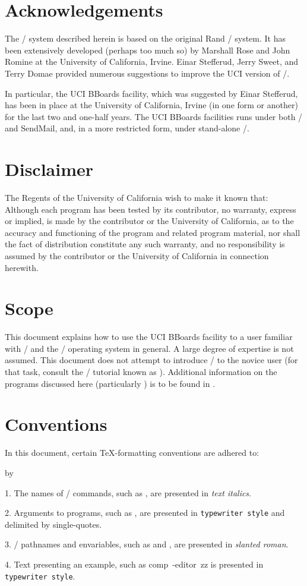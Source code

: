 \banner
\section{Acknowledgements}
The \MH/ system described herein is based on the original Rand \MH/ system.
It has been extensively developed (perhaps too much so) by Marshall Rose and
John Romine at the University of California, Irvine.
Einar Stefferud, Jerry Sweet, and Terry Domae provided numerous suggestions
to improve the UCI version of \MH/.

In particular, the UCI BBoards facility,
which was suggested by Einar Stefferud,
has been in place at the University of California, Irvine
(in one form or another) for the last two and one-half years.
The UCI BBoards facilities runs under both \MMDF/ and {\sf SendMail},
and, in a more restricted form, under stand-alone \MH/.

\section{Disclaimer}
The Regents of the University of California wish to make it known that:
\bigquote
Although each program has been tested by its contributor,
no warranty, express or implied,
is made by the contributor or the University of California,
as to the accuracy and functioning of the program
and related program material,
nor shall the fact of distribution constitute any such warranty,
and no responsibility is assumed by the contributor
or the University of California in connection herewith.
\endbigquote

\section{Scope}
This document explains how to use the UCI BBoards facility to a user familiar
with \MH/ and the \unix/ operating system in general.
A large degree of expertise is not assumed.
This document does not attempt to introduce \MH/ to the novice user
(for that task, consult the \MH/ tutorial known as \cite{MH.TUT}).
Additional information on the programs discussed here
(particularly ) is to be found in \cite{MH}.

\section{Conventions}
In this document,
certain \TeX -formatting conventions are adhered to:
\smallskip
{\advance\leftskip by\parindent
\item{1.} The names of \unix/ commands, such as ,
are presented in {\it text italics}.
\item{2.} Arguments to programs, such as ,
are presented in {\tt typewriter style} and delimited by single-quotes.
\item{3.} \unix/ pathnames and envariables,
such as  and ,
are presented in {\sl slanted roman}.
\item{4.} Text presenting an example, such as
\example comp\ -editor\ zz\endexample
is presented in {\tt typewriter style}.
\smallskip}

